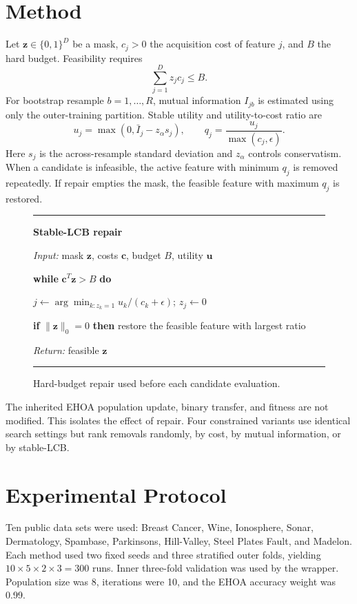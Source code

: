 \documentclass[10pt,journal,a4paper]{IEEEtran}
\begin{document}
\section{Method}
Let $\mathbf z\in\{0,1\}^D$ be a mask, $c_j>0$ the acquisition cost of feature $j$, and $B$ the hard budget. Feasibility requires
\begin{equation}\sum_{j=1}^{D}z_jc_j\le B.\end{equation}
For bootstrap resample $b=1,\ldots,R$, mutual information $I_{jb}$ is estimated using only the outer-training partition. Stable utility and utility-to-cost ratio are
\begin{equation}
u_j=\max\!\left(0,\bar I_j-z_{\alpha}s_j\right),\qquad q_j=\frac{u_j}{\max(c_j,\epsilon)}.
\end{equation}
Here $s_j$ is the across-resample standard deviation and $z_{\alpha}$ controls conservatism. When a candidate is infeasible, the active feature with minimum $q_j$ is removed repeatedly. If repair empties the mask, the feasible feature with maximum $q_j$ is restored.

\begin{figure}[t]
\small\hrule\vspace{3pt}
\textbf{Stable-LCB repair}\par
\emph{Input:} mask $\mathbf z$, costs $\mathbf c$, budget $B$, utility $\mathbf u$\par
\textbf{while} $\mathbf c^T\mathbf z>B$ \textbf{do}\par
\quad $j\leftarrow\arg\min_{k:z_k=1}u_k/(c_k+\epsilon)$; $z_j\leftarrow0$\par
\textbf{if} $\|\mathbf z\|_0=0$ \textbf{then} restore the feasible feature with largest ratio\par
\emph{Return:} feasible $\mathbf z$
\vspace{3pt}\hrule
\caption{Hard-budget repair used before each candidate evaluation.}
\end{figure}

The inherited EHOA population update, binary transfer, and fitness are not modified. This isolates the effect of repair. Four constrained variants use identical search settings but rank removals randomly, by cost, by mutual information, or by stable-LCB.

\section{Experimental Protocol}
Ten public data sets were used: Breast Cancer, Wine, Ionosphere, Sonar, Dermatology, Spambase, Parkinsons, Hill-Valley, Steel Plates Fault, and Madelon. Each method used two fixed seeds and three stratified outer folds, yielding $10\times5\times2\times3=300$ runs. Inner three-fold validation was used by the wrapper. Population size was 8, iterations were 10, and the EHOA accuracy weight was 0.99.
\end{document}
